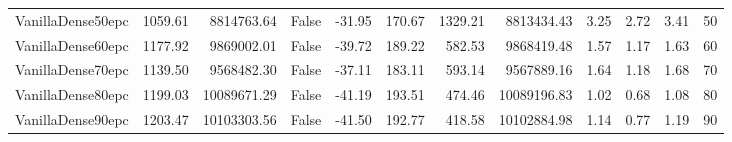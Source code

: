 \begin{tabular}{lrrlrrrrrrrl}
VanillaDense50epc & 1059.61 & 8814763.64 & False & -31.95 & 170.67 & 1329.21 & 8813434.43 & 3.25 & 2.72 & 3.41 & 50 \\
VanillaDense60epc & 1177.92 & 9869002.01 & False & -39.72 & 189.22 & 582.53 & 9868419.48 & 1.57 & 1.17 & 1.63 & 60 \\
VanillaDense70epc & 1139.50 & 9568482.30 & False & -37.11 & 183.11 & 593.14 & 9567889.16 & 1.64 & 1.18 & 1.68 & 70 \\
VanillaDense80epc & 1199.03 & 10089671.29 & False & -41.19 & 193.51 & 474.46 & 10089196.83 & 1.02 & 0.68 & 1.08 & 80 \\
VanillaDense90epc & 1203.47 & 10103303.56 & False & -41.50 & 192.77 & 418.58 & 10102884.98 & 1.14 & 0.77 & 1.19 & 90 \\
\bottomrule
\end{tabular}
